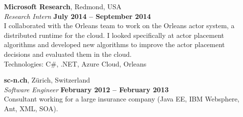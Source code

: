 \documentclass[margin,line]{cv/cv}
\begin{document}
\begin{resume}

    \textbf{Microsoft Research}, Redmond, USA \vspace{2mm}\\\vspace{1mm}%
    \textsl{Research Intern} \hfill \textbf{July 2014 -- September 2014}\\
    I collaborated with the Orleans team to work on the Orleans
    actor system, a distributed runtime for the cloud. I looked specifically at
    actor placement algorithms and developed new algorithms to improve the actor placement
    decisions and evaluated them in the cloud.\\ Technologies: C\#, .NET, Azure Cloud, Orleans


    \textbf{sc-n.ch}, Zürich, Switzerland \vspace{2mm}\\\vspace{1mm}%
    \textsl{Software Engineer} \hfill \textbf{February 2012 -- February 2013}\\
    Consultant working for a large insurance company (Java EE, IBM Websphere, Ant, XML, SOA).




\end{resume}
\end{document}
